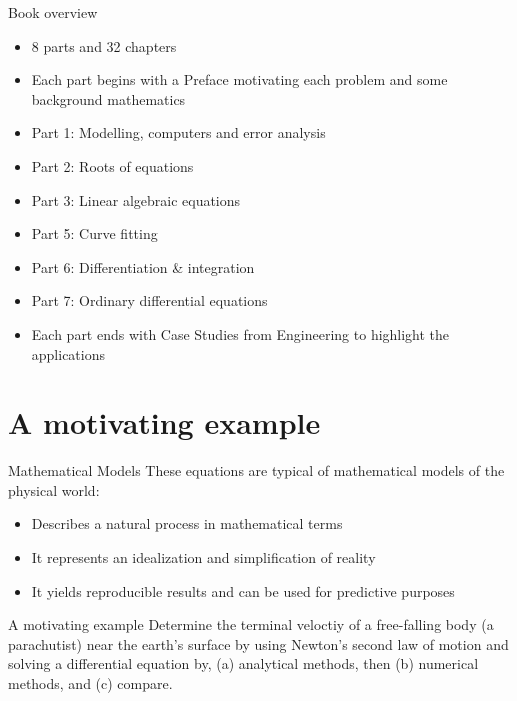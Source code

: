 \documentclass[12pt]{beamer}
\begin{document}
\begin{frame}{Book overview} 
\begin{itemize}
\item{8 parts and 32 chapters} 
\item{Each part begins with a Preface motivating each problem 
and some background mathematics} 
\item{Part 1: Modelling, computers and error analysis}
\item{Part 2: Roots of equations}
\item{Part 3: Linear algebraic equations}
\item{Part 5: Curve fitting}
\item{Part 6: Differentiation \& integration}
\item{Part 7: Ordinary differential equations}
\item{Each part ends with Case Studies from Engineering to highlight the applications}
\end{itemize} 
\end{frame} 

\section{A motivating example} 


\begin{frame}{Mathematical Models}
These equations are typical of mathematical models of the physical
world: 

\begin{itemize} 
\item{Describes a natural process in mathematical terms}
\item{It represents an idealization and simplification of reality} 
\item{It yields reproducible results and can be used for predictive
    purposes} 
\end{itemize} 
\end{frame}


\begin{frame}{A motivating example}
Determine the terminal veloctiy of a free-falling body (a parachutist)
near the earth's surface by using Newton's second law of motion and solving a differential equation by, 
(a) analytical methods, then (b) numerical methods, and 
(c) compare.

\vspace{2 in}

\end{frame}
\end{document}
